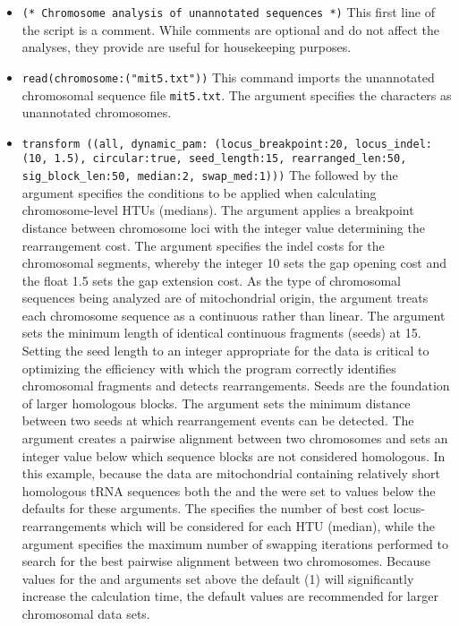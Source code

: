 \begin{itemize}
\item \texttt{(* Chromosome analysis of unannotated sequences *)} This first line of the script is a comment. While comments are optional and do not affect the analyses, they provide are useful for housekeeping purposes.
\item \texttt{read(chromosome:("mit5.txt"))} This command imports the unannotated chromosomal sequence file \texttt{mit5.txt}. The argument  specifies the characters as unannotated chromosomes.
\item \texttt{transform ((all, dynamic\_pam: (locus\_breakpoint:20, locus\_indel:(10, 1.5), circular:true, seed\_length:15, rearranged\_len:50, sig\_block\_len:50, median:2, swap\_med:1)))}  The  followed by the argument  specifies the conditions to be applied when calculating chromosome-level HTUs (medians).  The argument  applies a breakpoint distance between chromosome loci with the integer value determining the rearrangement cost. The argument  specifies the indel costs for the chromosomal segments, whereby the integer 10 sets the gap opening cost and the float 1.5 sets the gap extension cost.  As the type of chromosomal sequences being analyzed are of mitochondrial origin, the argument  treats each chromosome sequence as a continuous rather than linear. The argument  sets the minimum length of identical continuous fragments (seeds) at 15.  Setting the seed length to an integer appropriate for the data is critical to optimizing the efficiency with which the program correctly identifies chromosomal fragments and detects rearrangements.  Seeds are the foundation of larger homologous blocks.  The  argument sets the minimum distance between two seeds at which rearrangement events can be detected.  The argument  creates a pairwise alignment between two chromosomes and sets an integer value below which sequence blocks are not considered homologous.  In this example, because the data are mitochondrial containing relatively short homologous tRNA sequences both the  and the  were set to values below the defaults for these arguments.  The  specifies the number of best cost locus-rearrangements which will be considered for each HTU (median), while the  argument specifies the maximum number of swapping iterations performed to search for the best pairwise alignment between two chromosomes.  Because values for the  and  arguments set above the default (1) will significantly increase the calculation time, the default values are recommended for larger chromosomal data sets.

\end{itemize}
